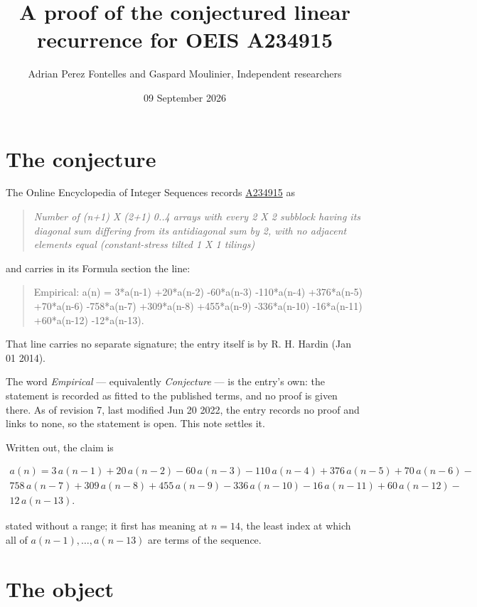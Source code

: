 \documentclass[11pt]{article}
\title{A proof of the conjectured linear recurrence for OEIS A234915}
\author{Adrian Perez Fontelles and Gaspard Moulinier, Independent researchers}
\date{09 September 2026}
\theoremstyle{definition}
\begin{document}
\maketitle
\section{The conjecture}

The Online Encyclopedia of Integer Sequences records \href{https://oeis.org/A234915}{A234915} as

\begin{quote}\itshape Number of (n+1) X (2+1) 0..4 arrays with every 2 X 2 subblock having its diagonal sum differing from its antidiagonal sum by 2, with no adjacent elements equal (constant-stress tilted 1 X 1 tilings)\end{quote}

and carries in its Formula section the line:

\begin{quote}\ttfamily Empirical: a(n) = 3*a(n-1) +20*a(n-2) -60*a(n-3) -110*a(n-4) +376*a(n-5) +70*a(n-6) -758*a(n-7) +309*a(n-8) +455*a(n-9) -336*a(n-10) -16*a(n-11) +60*a(n-12) -12*a(n-13).\end{quote}

That line carries no separate signature; the entry itself is by R. H. Hardin (Jan 01 2014).

The word {\itshape Empirical} --- equivalently {\itshape Conjecture} --- is the entry's own: the statement is recorded as fitted to the published terms, and no proof is given there. As of revision 7, last modified Jun 20 2022, the entry records no proof and links to none, so the statement is open. This note settles it.

Written out, the claim is

\begin{multline*} a(n) = 3\,a(n-1) + 20\,a(n-2) - 60\,a(n-3) - 110\,a(n-4) + 376\,a(n-5) + 70\,a(n-6) - \\ 758\,a(n-7) + 309\,a(n-8) + 455\,a(n-9) - 336\,a(n-10) - 16\,a(n-11) + 60\,a(n-12) - \\ 12\,a(n-13). \end{multline*}

stated without a range; it first has meaning at $n = 14$, the least index at which all of $a(n-1),\dots,a(n-13)$ are terms of the sequence.

\section{The object}
\end{document}
